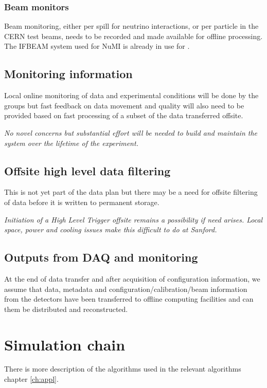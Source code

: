 \documentclass[../main-v1.tex]{subfiles}
\begin{document}

\subsubsection{Beam monitors}
Beam monitoring, either per spill for neutrino interactions, or per particle in the CERN test beams, needs to be recorded and made available for offline processing. 
The IFBEAM system used for NuMI is already in use for .

\subsection{Monitoring information}
Local online monitoring of data and experimental conditions will be done by the  groups but fast feedback on data movement and quality will also need to be provided based on fast processing of a subset of the data transferred offsite. 

{\it No novel concerns but substantial effort will be needed to build and maintain the system over the lifetime of the experiment.}

\subsection{Offsite high level data filtering}
This is not yet part of the data plan but there may be a need for offsite filtering of data before it is written to permanent storage. 

{\it  Initiation of a High Level Trigger offsite remains a possibility if need arises. Local space, power and cooling issues make this difficult to do at Sanford.}

\subsection{Outputs from DAQ and monitoring}
At the end of data transfer and after acquisition of configuration information,  we assume that data, metadata and configuration/calibration/beam information from the detectors have been transferred to offline computing facilities and can them be distributed and reconstructed. 




\section{Simulation chain}

There is more description of the algorithms used in the relevant algorithms chapter \ref{ch:appl}.  
\end{document}
